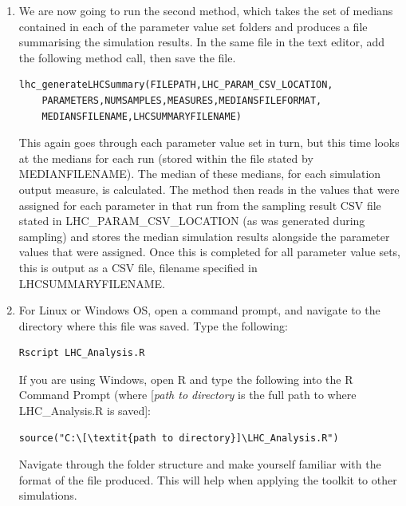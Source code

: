 \documentclass[a4paper,11pt]{article}
\begin{document}
\begin{enumerate}
\begin{verbatim}
#lhc_process_sample_run_subsets(FILEPATH,NUMSAMPLES,
#	NUMRUNSPERSAMPLE,MEASURES,RESULTFILEFORMAT,
#	RESULTSFILENAME,ALTERNATIVEFILENAME,OUTPUTCOLSTART,
#	OUTPUTCOLEND,MEDIANSFILEFORMAT,MEDIANSFILENAME)
\end{verbatim}

\item We are now going to run the second method, which takes the set of medians contained in each of the parameter value set folders and produces a file summarising the simulation results. In the same file in the text editor, add the following method call, then save the file.

\begin{verbatim}
lhc_generateLHCSummary(FILEPATH,LHC_PARAM_CSV_LOCATION,
	PARAMETERS,NUMSAMPLES,MEASURES,MEDIANSFILEFORMAT,
	MEDIANSFILENAME,LHCSUMMARYFILENAME)
\end{verbatim}

This again goes through each parameter value set in turn, but this time looks at the medians for each run (stored within the file stated by MEDIANFILENAME). The median of these medians, for each simulation output measure, is calculated. The method then reads in the values that were assigned for each parameter in that run from the sampling result CSV file stated in LHC\_PARAM\_CSV\_LOCATION (as was generated during sampling) and stores the median simulation results alongside the parameter values that were assigned. Once this is completed for all parameter value sets, this is output as a CSV file, filename specified in LHCSUMMARYFILENAME.

\item For Linux or Windows OS, open a command prompt, and navigate to the directory where this file was saved.  Type the following:

\begin{verbatim}
Rscript LHC_Analysis.R
\end{verbatim}

If you are using Windows, open R and type the following into the R Command Prompt (where [\textit{path to directory} is the full path to where LHC\_Analysis.R is saved]:

\begin{verbatim}
source("C:\[\textit{path to directory}]\LHC_Analysis.R")
\end{verbatim}

Navigate through the folder structure and make yourself familiar with the format of the file produced. This will help when applying the toolkit to other simulations.


\end{enumerate}
\end{document}
